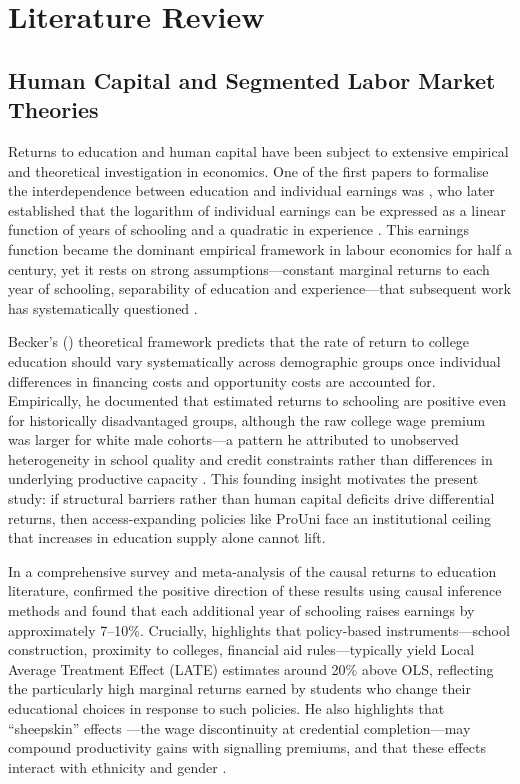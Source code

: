 \clearpage
\section{Literature Review}
\label{sec:literature}
\subsection{Human Capital and Segmented Labor Market Theories}

Returns to education and human capital have been subject to extensive empirical and theoretical investigation in economics. One of the first papers to formalise the interdependence between education and individual earnings was , who later established that the logarithm of individual earnings can be expressed as a linear function of years of schooling and a quadratic in experience \cite{Mincer1974}. This earnings function became the dominant empirical framework in labour economics for half a century, yet it rests on strong assumptions---constant marginal returns to each year of schooling, separability of education and experience---that subsequent work has systematically questioned \cite{HeckmanLochnerTodd2006}.

Becker's (\citeyear{Becker1964}) theoretical framework predicts that the rate of return to college education should vary systematically across demographic groups once individual differences in financing costs and opportunity costs are accounted for. Empirically, he documented that estimated returns to schooling are positive even for historically disadvantaged groups, although the raw college wage premium was larger for white male cohorts---a pattern he attributed to unobserved heterogeneity in school quality and credit constraints rather than differences in underlying productive capacity \cite[Ch.~4]{Becker1964}. This founding insight motivates the present study: if structural barriers rather than human capital deficits drive differential returns, then access-expanding policies like ProUni face an institutional ceiling that increases in education supply alone cannot lift.

In a comprehensive survey and meta-analysis of the causal returns to education literature,  confirmed the positive direction of these results using causal inference methods and found that each additional year of schooling raises earnings by approximately 7--10\%. Crucially,  highlights that policy-based instruments---school construction, proximity to colleges, financial aid rules---typically yield Local Average Treatment Effect (LATE) estimates around 20\% above OLS, reflecting the particularly high marginal returns earned by students who change their educational choices in response to such policies. He also highlights that ``sheepskin'' effects \cite{Hungerford1987}---the wage discontinuity at credential completion---may compound productivity gains with signalling premiums, and that these effects interact with ethnicity and gender \cite{BelmanHeywood1991}.
